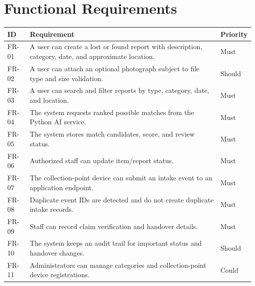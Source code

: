 \documentclass[12pt,a4paper]{report}
\begin{document}
\section{Functional Requirements}
\begin{longtable}{p{}p{}p{}}
\toprule
ID & Requirement & Priority\\\midrule
FR-01 & A user can create a lost or found report with description, category, date, and approximate location. & Must\\
FR-02 & A user can attach an optional photograph subject to file type and size validation. & Should\\
FR-03 & A user can search and filter reports by type, category, date, and location. & Must\\
FR-04 & The system requests ranked possible matches from the Python AI service. & Must\\
FR-05 & The system stores match candidates, score, and review status. & Must\\
FR-06 & Authorized staff can update item/report status. & Must\\
FR-07 & The collection-point device can submit an intake event to an application endpoint. & Must\\
FR-08 & Duplicate event IDs are detected and do not create duplicate intake records. & Must\\
FR-09 & Staff can record claim verification and handover details. & Must\\
FR-10 & The system keeps an audit trail for important status and handover changes. & Should\\
FR-11 & Administrators can manage categories and collection-point device registrations. & Could\\
\bottomrule
\end{longtable}
\end{document}
